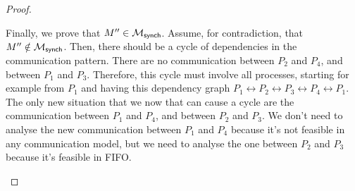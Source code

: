 \begin{proof}
\begin{itemize}
		      Finally, we prove that $M'' \in \mathcal{M}_{\mathsf{synch}}$.
		      Assume, for contradiction, that $M'' \notin \mathcal{M}_{\mathsf{synch}}$.
		      Then, there should be a cycle of dependencies in the communication pattern.
		      There are no communication between $P_2$ and $P_4$, and between $P_1$
		      and $P_3$. Therefore, this cycle must involve all processes, starting
		      for example from $P_1$ and having this dependency graph
		      $P_1\leftrightarrow P_2\leftrightarrow P_3\leftrightarrow P_4\leftrightarrow P_1$.
		      The only new situation that we now that can cause a cycle are the communication
		      between $P_1$ and $P_4$, and between $P_2$ and $P_3$.
		      We don't need to analyse the new communication between $P_1$ and $P_4$ because
		      it's not feasible in any communication model, but we need to analyse the one
		      between $P_2$ and $P_3$ because it's feasible in FIFO.





		      \begin{figure}[!ht]
			      \centering
			      \begin{msc}[draw frame=none, draw head=none, msc keyword=, head height=0px, label distance=0.5ex, foot height=0px, foot distance=0px]{}


\end{msc}
\end{figure}
\end{itemize}
\end{proof}
